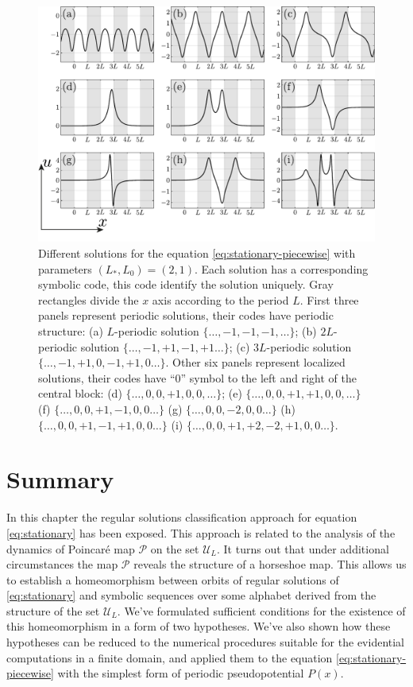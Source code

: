 \begin{figure}[h]
\centering
	\includegraphics[scale = 1]{pic/solutions for the piecewise equation}
	\caption{
		Different solutions for the equation \eqref{eq:stationary-piecewise} with parameters $(L_*, L_0) = (2, 1)$.
		Each solution has a corresponding symbolic code, this code identify the solution uniquely.
		Gray rectangles divide the $x$ axis according to the period $L$.
		First three panels represent periodic solutions, their codes have periodic structure: (a) $L$-periodic solution $\{ \dots, -1, -1, -1, \dots \}$; (b) $2L$-periodic solution $\{ \dots, -1, +1, -1, +1 \dots \}$; (c) $3L$-periodic solution $\{ \dots, -1, +1, 0, -1, +1, 0 \dots \}$.
		Other six panels represent localized solutions, their codes have ``$0$'' symbol to the left and right of the central block: (d) $\{ \dots, 0, 0, +1, 0, 0, \dots \}$; (e) $\{ \dots, 0, 0, +1, +1, 0, 0, \dots \}$ (f) $\{ \dots, 0, 0, +1, -1, 0, 0 \dots \}$ (g) $\{ \dots, 0, 0, -2, 0, 0 \dots \}$ (h) $\{ \dots, 0, 0, +1, -1, +1, 0, 0 \dots \}$ (i) $\{ \dots, 0, 0, +1, +2, -2, +1, 0, 0 \dots \}$.
	}
\label{fig:solutions-piecewise}
\end{figure}

\section{Summary}

In this chapter the regular solutions classification approach for equation \eqref{eq:stationary} has been exposed.
This approach is related to the analysis of the dynamics of Poincar\'e map $\mathcal{P}$ on the set $\mathscr{U}_L$.
It turns out that under additional circumstances the map $\mathcal{P}$ reveals the structure of a horseshoe map.
This allows us to establish a homeomorphism between orbits of regular solutions of \eqref{eq:stationary} and symbolic sequences over some alphabet derived from the structure of the set $\mathscr{U}_L$.
We've formulated sufficient conditions for the existence of this	 homeomorphism in a form of two hypotheses.
We've also shown how these hypotheses can be reduced to the numerical procedures suitable for the evidential computations in a finite domain, and applied them to the equation \eqref{eq:stationary-piecewise} with the simplest form of periodic pseudopotential $P(x)$.

